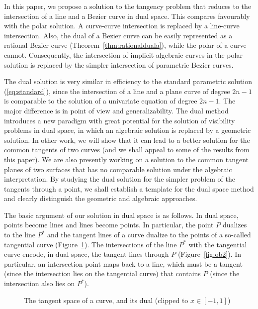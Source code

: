 \documentclass[11pt]{article}
\begin{document}
In this paper, we propose a solution to the tangency problem
that reduces to the intersection of a line and a Bezier curve in dual space.
This compares favourably with the polar solution.
A curve-curve intersection is replaced by a line-curve intersection.
Also, the dual of a Bezier curve
can be easily represented as a rational Bezier curve (Theorem~\ref{thm:rationalduala}),
while the polar of a curve cannot.
Consequently, the intersection of implicit algebraic curves in the polar solution
is replaced by the simpler intersection of parametric Bezier curves.

The dual solution is very similar in efficiency to the standard parametric
solution (\ref{eq:standard}), since the intersection of a line and a plane
curve of degree $2n-1$ is comparable to the solution of a univariate equation
of degree $2n-1$.
The major difference is in point of view and generalizability.
The dual method introduces a new paradigm with great potential for the
solution of visibility problems in dual space,
in which an algebraic solution is replaced by a geometric solution.
In other work, we will show that it can lead to a better solution
for the common tangents of two curves \cite{jj00}
(and we shall appeal to some of the results from this paper).
We are also presently working on a solution to the common tangent planes of two
surfaces that has no comparable solution under the algebraic interpretation.
By studying the dual solution for the simpler problem of 
the tangents through a point,
we shall establish a template for the dual space method
and clearly distinguish the geometric and algebraic approaches.

The basic argument of our solution in dual space is as follows.
In dual space, points become lines and lines become points.
In particular, the point $P$ dualizes to the line $P^*$ and 
the tangent lines of a curve dualize to the points of a so-called 
tangential curve (Figure~\ref{fig:duality}).
The intersections of the line $P^*$ with the tangential curve
encode, in dual space, the tangent lines through $P$
(Figure~\ref{fig:ob2}).
In particular, an intersection point maps back to a line, which
must be a tangent (since the intersection lies on the tangential curve)
that contains $P$ (since the intersection also lies on $P^*$).



\begin{figure}
\hspace{.4in} \setjjpolf
\caption{The tangent space of a curve, and its dual (clipped to $x \in [-1,1]$)}
\label{fig:duality}
\end{figure}
\end{document}
